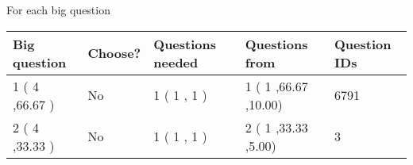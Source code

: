 \documentclass{ctexart}
\begin{document}
   
 \newpage
   
{\LARGE{For each big question}}
   
   
\vspace{0.2in}
   
   
\noindent\hspace{-0.4in}\begin{tabular}{|l|l|l|l|l|}
\hline
 Big question & Choose? & Questions needed & Questions from & Question IDs \\ 
\hline
 1 ( 4 ,66.67
 ) &  No   & 
 1 ( 1 ,  1 ) &  1 ( 1
,66.67
 ,10.00) &  6791  \\
 \hline
 2 ( 4 ,33.33
 ) &  No   & 
 1 ( 1 ,  1 ) &  2 ( 1
,33.33
 ,5.00) &  3  \\
 \hline
 \end{tabular}
 
 
\end{document}
